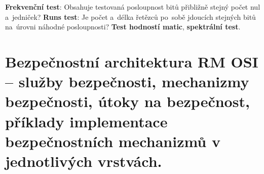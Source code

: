 \textbf{Frekvenční test}: Obsahuje testovaná posloupnost bitů přibližně stejný počet nul a~jedniček? \textbf{Runs test}: Je počet a~délka řetězců po~sobě jdoucích stejných bitů na~úrovni náhodné posloupnosti? \textbf{Test hodností matic}, \textbf{spektrální test}.

\clearpage
\section{Bezpečnostní architektura RM OSI -- služby bezpečnosti, mechanizmy bezpečnosti, útoky na bezpečnost, příklady implementace bezpečnostních mechanizmů v jednotlivých vrstvách.}
